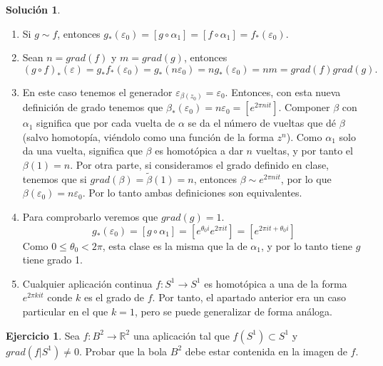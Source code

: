 \documentclass{article}
\theoremstyle{plain}
\theoremstyle{definition}
\newtheorem{exercise}{Ejercicio}
\newtheorem*{sol*}{Solución}
\begin{document}
\begin{sol*}
\begin{enumerate}
\item Si $g\sim f$, entonces $g_*(\varepsilon_0)=[g\circ\alpha_1]=[f\circ\alpha_1]=f_*(\varepsilon_0)$.
\item Sean $n=grad(f)$ y $m=grad(g)$, entonces $$(g\circ f)_*(\varepsilon)=g_*f_*(\varepsilon_0)=g_*(n\varepsilon_0)=ng_*(\varepsilon_0)=nm=grad(f)grad(g).$$
\item En este caso tenemos el generador $\varepsilon_{\beta(z_0)}=\varepsilon_0$. Entonces, con esta nueva definición de grado tenemos que $\beta_*(\varepsilon_0)=n\varepsilon_0=[e^{2\pi n it}]$. Componer $\beta$ con $\alpha_1$ significa que por cada vuelta de $\alpha$ se da el número de vueltas que dé $\beta$ (salvo homotopía, viéndolo como una función de la forma $z^n$). Como $\alpha_1$ solo da una vuelta, significa que $\beta$ es homotópica a dar $n$ vueltas, y por tanto el $\beta(1)=n$. Por otra parte, si consideramos el grado definido en clase, tenemos que si $grad(\beta
)=\tilde{\beta}(1)=n$, entonces $\beta\sim e^{2\pi n it}$, por lo que $\beta(\varepsilon_0)=n\varepsilon_0$. Por lo tanto ambas definiciones son equivalentes.
\item Para comprobarlo veremos que $grad(g)=1$. $$g_*(\varepsilon_0)=[g\circ\alpha_1]=[e^{\theta_0 i}e^{2\pi i t}]=[e^{2\pi it +\theta_0 i}]$$ 
Como $0\leq \theta_0 < 2\pi$, esta clase es la misma que la de $\alpha_1$, y por lo tanto tiene $g$ tiene grado 1.
\item Cualquier aplicación continua $f:S^1\to S^1$ es homotópica a una de la forma $e^{2\pi k it}$ conde $k$ es el grado de $f$. Por tanto, el apartado anterior era un caso particular en el que $k=1$, pero se puede generalizar de forma análoga.
\end{enumerate}
\end{sol*}

\newpage

\begin{exercise}
Sea $f:B^2 \to \mathbb{R}^2$ una aplicaci\'on tal que $f(S^1) \subset S^1$ y
$grad (f|S^1)\neq 0$. Probar que la bola $B^2$ debe estar contenida en la imagen de $f$.
\end{exercise}

\newpage
\end{document}
